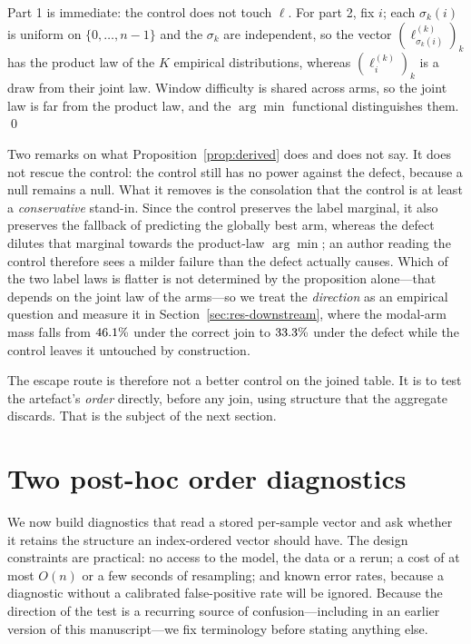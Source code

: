 \documentclass[a4paper,fleqn]{cas-sc}
\begin{document}
\begin{pf}
Part 1 is immediate: the control does not touch $\ell$. For part 2, fix $i$; each
$\sigma_k(i)$ is uniform on $\{0,\dots,n-1\}$ and the $\sigma_k$ are independent, so
the vector $(\ell^{(k)}_{\sigma_k(i)})_k$ has the product law of the $K$ empirical
distributions, whereas $(\ell^{(k)}_i)_k$ is a draw from their joint law. Window
difficulty is shared across arms, so the joint law is far from the product law, and
the $\arg\min$ functional distinguishes them. \qed
\end{pf}

Two remarks on what Proposition~\ref{prop:derived} does and does not say. It does
not rescue the control: the control still has no power against the defect, because
a null remains a null. What it removes is the consolation that the control is at
least a \emph{conservative} stand-in. Since the control preserves the label
marginal, it also preserves the fallback of predicting the globally best arm,
whereas the defect dilutes that marginal towards the product-law $\arg\min$; an
author reading the control therefore sees a milder failure than the defect
actually causes. Which of the two label laws is flatter is not determined by the
proposition alone---that depends on the joint law of the arms---so we treat the
\emph{direction} as an empirical question and measure it in
Section~\ref{sec:res-downstream}, where the modal-arm mass falls from
$46.1\%$ under the correct join to $33.3\%$ under
the defect while the control leaves it untouched by construction.

The escape route is therefore not a better control on the joined table. It is to
test the artefact's \emph{order} directly, before any join, using structure that
the aggregate discards. That is the subject of the next section.

\section{Two post-hoc order diagnostics}
\label{sec:tests}

We now build diagnostics that read a stored per-sample vector and ask whether it
retains the structure an index-ordered vector should have. The design constraints
are practical: no access to the model, the
data or a rerun; a cost of at most $O(n)$ or a few seconds of resampling; and
known error rates, because a diagnostic without a calibrated false-positive rate
will be ignored. Because the direction of the test is a recurring source of
confusion---including in an earlier version of this manuscript---we fix
terminology before stating anything else.
\end{document}
